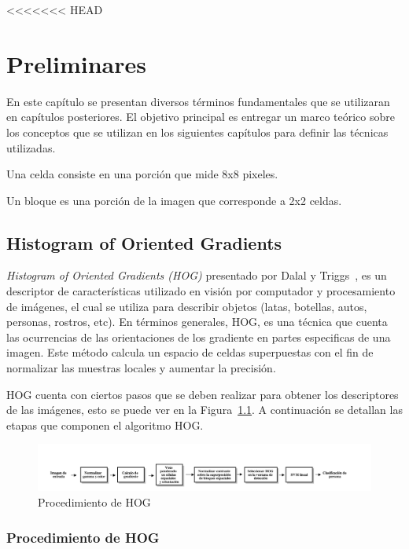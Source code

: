 <<<<<<< HEAD
\chapter[Preliminares ]{Preliminares }\label{ch:capitulo3}
En este capítulo se presentan diversos términos fundamentales que se utilizaran en capítulos posteriores. El objetivo principal es entregar un marco teórico sobre los conceptos que se utilizan en los siguientes capítulos para definir las técnicas utilizadas.
\begin{definition}[Celdas]
\label{def:cel}
Una celda consiste en una porción que mide 8x8 pixeles.
\end{definition}
\begin{definition}[Bloques]
\label{def:blo}
Un bloque es una porción de la imagen que corresponde a 2x2 celdas.
\end{definition}

\section{Histogram of Oriented Gradients}
\label{subsec:hog}
\textit{Histogram of Oriented Gradients (HOG)} presentado por Dalal y Triggs~\cite{hog2005}, es un descriptor de características utilizado en visión por computador y procesamiento de imágenes, el cual se utiliza para describir objetos (latas, botellas, autos, personas, rostros, etc). En términos generales, HOG, es una técnica que cuenta las ocurrencias de las orientaciones de los gradiente en partes especificas de una imagen. Este método calcula un espacio de celdas superpuestas con el fin de normalizar las muestras locales y aumentar la precisión.

HOG cuenta con ciertos pasos que se deben realizar para obtener los descriptores de las imágenes, esto se puede ver en la Figura~\ref{fig:hog_procedure}. A continuación se detallan las etapas que componen el algoritmo HOG.
\begin{figure}[tb]
  \centering
   \includegraphics[width=1\textwidth]{Figuras/hog-procedure.png}
   \caption{Procedimiento de HOG}
   \label{fig:hog_procedure}
\end{figure}

\subsection{Procedimiento de HOG}

